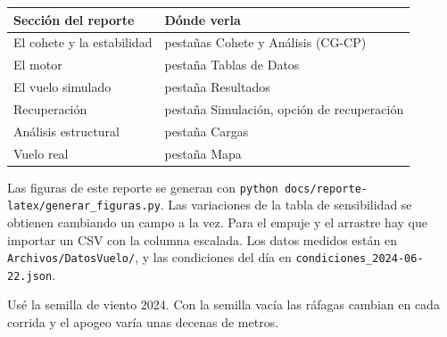 {\def\LTcaptype{none} %
\begin{longtable}[]{@{}
  >{\raggedright\arraybackslash}p{}
  >{\raggedright\arraybackslash}p{}@{}}
\toprule\noalign{}
\begin{minipage}[b]{\linewidth}\raggedright
Sección del reporte
\end{minipage} & \begin{minipage}[b]{\linewidth}\raggedright
Dónde verla
\end{minipage} \\
\midrule\noalign{}
\endhead
\bottomrule\noalign{}
\endlastfoot
El cohete y la estabilidad & pestañas Cohete y Análisis
(CG-CP) \\
El motor & pestaña Tablas de Datos \\
El vuelo simulado & pestaña Resultados \\
Recuperación & pestaña Simulación, opción de recuperación \\
Análisis estructural & pestaña Cargas \\
Vuelo real & pestaña Mapa \\
\end{longtable}
}

Las figuras de este reporte se generan con
\texttt{python\ docs/reporte-latex/generar\_figuras.py}. Las
variaciones de la tabla de sensibilidad se obtienen
cambiando un campo a la vez. Para el empuje y el arrastre
hay que importar un CSV con la columna escalada. Los datos
medidos están en \texttt{Archivos/DatosVuelo/}, y las
condiciones del día en
\texttt{condiciones\_2024-06-22.json}.

Usé la semilla de viento 2024. Con la semilla vacía las
ráfagas cambian en cada corrida y el apogeo varía unas
decenas de metros.
